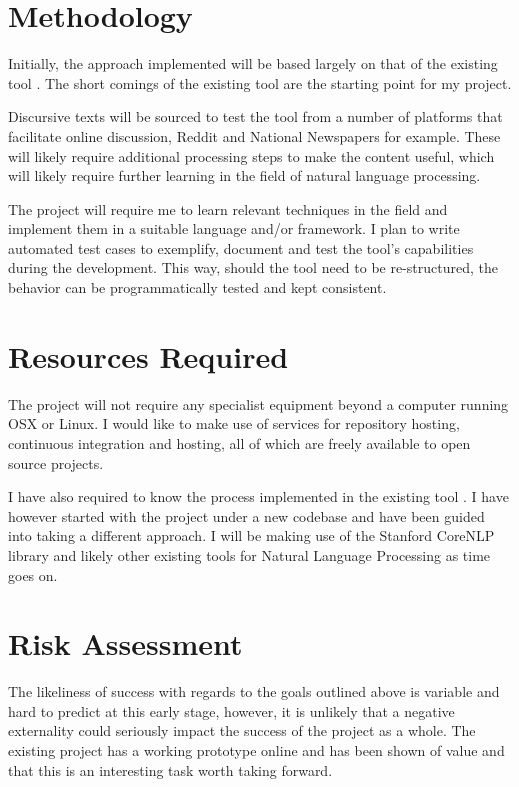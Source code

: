 \documentclass[tikz]{article}
\begin{document}
  \section{Methodology}
    Initially, the approach implemented will be based largely on that of the existing tool \citep{existing}. The short comings of the existing tool are the starting point for my project.

      Discursive texts will be sourced to test the tool from a number of platforms that facilitate online discussion, Reddit and National Newspapers for example. These will likely require additional processing steps to make the content useful, which will likely require further learning in the field of natural language processing.

      The project will require me to learn relevant techniques in the field and implement them in a suitable language and/or framework. I plan to write automated test cases to exemplify, document and test the tool's capabilities during the development. This way, should the tool need to be re-structured, the behavior can be programmatically tested and kept consistent.

  \section{Resources Required}
    The project will not require any specialist equipment beyond a computer running OSX or Linux. I would like to make use of services for repository hosting, continuous integration and hosting, all of which are freely available to open source projects.

    I have also required to know the process implemented in the existing tool \citep{existing}. I have however started with the project under a new codebase and have been guided into taking a different approach. I will be making use of the Stanford CoreNLP \cite{corenlp} library and likely other existing tools for Natural Language Processing as time goes on.

  \section{Risk Assessment}
    The likeliness of success with regards to the goals outlined above is variable and hard to predict at this early stage, however, it is unlikely that a negative externality could seriously impact the success of the project as a whole. The existing project has a working prototype \citep{existing} online and has been shown of value and that this is an interesting task worth taking forward.
\end{document}
